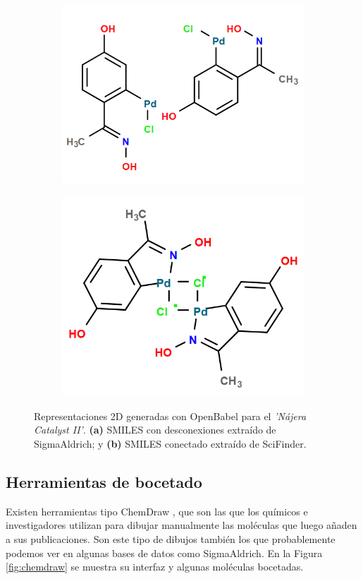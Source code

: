 \begin{figure}[h!]
\centering
\begin{subfigure}{.5\textwidth}
  \centering
  \includegraphics[width=.9\linewidth, frame]{imagenes/estado_arte/dotted_SA.png}
  \caption{}
\end{subfigure}%
\begin{subfigure}{.5\textwidth}
  \centering
  \includegraphics[width=.8\linewidth, frame]{imagenes/estado_arte/not_dotted_SF.png}
  \caption{}
\end{subfigure}
\caption{Representaciones 2D generadas con OpenBabel para el \emph{'Nájera Catalyst II'}. \textbf{(a)} SMILES con desconexiones extraído de SigmaAldrich; y \textbf{(b)} SMILES conectado extraído de SciFinder.}
\label{fig:dotted_smiles_vs_complete}
\end{figure}


\subsection{Herramientas de bocetado}
Existen herramientas tipo ChemDraw \cite{chemdraw_page}, que son las que los químicos e investigadores utilizan para dibujar manualmente las moléculas que luego añaden a sus publicaciones. Son este tipo de dibujos también los que probablemente podemos ver en algunas bases de datos como SigmaAldrich. En la Figura \ref{fig:chemdraw} se muestra su interfaz y algunas moléculas bocetadas.

